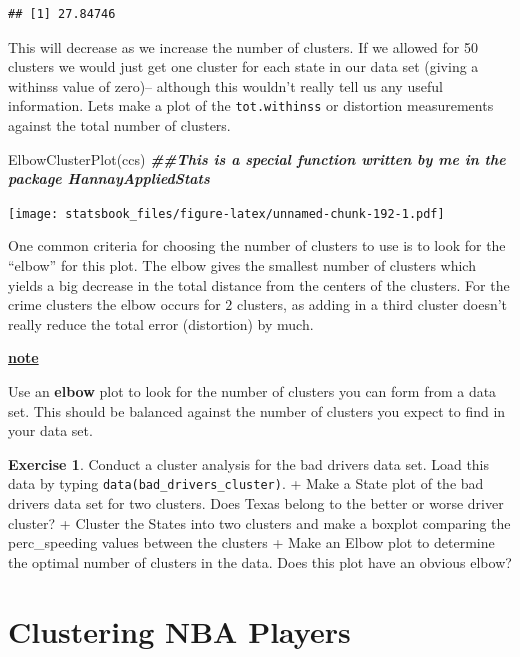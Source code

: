 \documentclass[
]{book}
\newenvironment{Shaded}{\begin{snugshade}}{\end{snugshade}}
\newcommand{\DocumentationTok}[1]{\textcolor[rgb]{0.56,0.35,0.01}{\textbf{\textit{#1}}}}
\newcommand{\FunctionTok}[1]{\textcolor[rgb]{0.00,0.00,0.00}{#1}}
\newcommand{\NormalTok}[1]{#1}
\newenvironment{rmdblock}[1]
  {\begin{shaded*}
  \centerline{\underline{\textbf{#1}}}

  }
  {
  \end{shaded*}
  }
\newenvironment{note}
  {\begin{rmdblock}{note}}
  {\end{rmdblock}}
\theoremstyle{definition}
\theoremstyle{definition}
\theoremstyle{definition}
\newtheorem{exercise}{Exercise}[chapter]
\theoremstyle{definition}
\theoremstyle{remark}
\begin{document}
\begin{verbatim}
## [1] 27.84746
\end{verbatim}

This will decrease as we increase the number of clusters. If we allowed for 50 clusters we would just get one cluster for each state in our data set (giving a withinss value of zero)-- although this wouldn't really tell us any useful information. Lets make a plot of the \texttt{tot.withinss} or distortion measurements against the total number of clusters.

\begin{Shaded}
\begin{Highlighting}[]
\FunctionTok{ElbowClusterPlot}\NormalTok{(ccs)  }\DocumentationTok{\#\#This is a special function written by me in the package HannayAppliedStats}
\end{Highlighting}
\end{Shaded}

\texttt{[image: statsbook\_files/figure-latex/unnamed-chunk-192-1.pdf]}

One common criteria for choosing the number of clusters to use is to look for the ``elbow'' for this plot. The elbow gives the smallest number of clusters which yields a big decrease in the total distance from the centers of the clusters. For the crime clusters the elbow occurs for \(2\) clusters, as adding in a third cluster doesn't really reduce the total error (distortion) by much.

\begin{note}
Use an \textbf{elbow} plot to look for the number of clusters you can form from a data set. This should be balanced against the number of clusters you expect to find in your data set.
\end{note}

\begin{exercise}
\protect\hypertarget{exr:unnamed-chunk-194}{}\label{exr:unnamed-chunk-194}Conduct a cluster analysis for the bad drivers data set. Load this data by typing \texttt{data(bad\_drivers\_cluster)}.
+ Make a State plot of the bad drivers data set for two clusters. Does Texas belong to the better or worse driver cluster?
+ Cluster the States into two clusters and make a boxplot comparing the perc\_speeding values between the clusters
+ Make an Elbow plot to determine the optimal number of clusters in the data. Does this plot have an obvious elbow?
\end{exercise}

\hypertarget{clustering-nba-players}{%
\section{Clustering NBA Players}\label{clustering-nba-players}}
\end{document}

